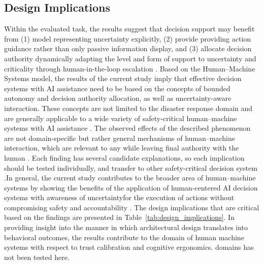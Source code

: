 \documentclass[journal]{IEEEtran}
\theoremstyle{plain}
\theoremstyle{definition}
\providecommand{\DIFaddtex}[1]{{\protect\color{blue} \sf #1}} %
\providecommand{\DIFdeltex}[1]{{\protect\color{red} \scriptsize #1}} %
\providecommand{\DIFaddbegin}{} %
\providecommand{\DIFaddend}{} %
\providecommand{\DIFdelbegin}{} %
\providecommand{\DIFdelend}{} %
\providecommand{\DIFadd}[1]{\texorpdfstring{\DIFaddtex{#1}}{#1}} %
\providecommand{\DIFdel}[1]{\texorpdfstring{\DIFdeltex{#1}}{}} %
\newcommand{\DIFscaledelfig}{0.5}
\newlength{\DIFdelgraphicswidth} %
\newlength{\DIFdelgraphicsheight} %
\newcommand{\DIFaddincludegraphics}[2][]{{\color{blue}\fbox{\DIFOincludegraphics[#1]{#2}}}} %
\newcommand{\DIFdelincludegraphics}[2][]{%
\sbox{\DIFdelgraphicsbox}{\DIFOincludegraphics[#1]{#2}}%
\settoboxwidth{\DIFdelgraphicswidth}{\DIFdelgraphicsbox} %
\settoboxtotalheight{\DIFdelgraphicsheight}{\DIFdelgraphicsbox} %
\scalebox{\DIFscaledelfig}{%
\parbox[b]{\DIFdelgraphicswidth}{\usebox{\DIFdelgraphicsbox}\\[-\baselineskip] \rule{\DIFdelgraphicswidth}{0em}}\llap{\resizebox{\DIFdelgraphicswidth}{\DIFdelgraphicsheight}{%
\setlength{\unitlength}{\DIFdelgraphicswidth}%
\begin{picture}(1,1)%
\thicklines\linethickness{2pt} %
{\color[rgb]{1,0,0}\put(0,0){\framebox(1,1){}}}%
{\color[rgb]{1,0,0}\put(0,0){\line( 1,1){1}}}%
{\color[rgb]{1,0,0}\put(0,1){\line(1,-1){1}}}%
\end{picture}%
}\hspace*{3pt}}} %
} %
\DeclareRobustCommand{\DIFaddbegin}{\DIFOaddbegin \let\includegraphics\DIFaddincludegraphics} %
\DeclareRobustCommand{\DIFaddend}{\DIFOaddend \let\includegraphics\DIFOincludegraphics} %
\DeclareRobustCommand{\DIFdelbegin}{\DIFOdelbegin \let\includegraphics\DIFdelincludegraphics} %
\DeclareRobustCommand{\DIFdelend}{\DIFOaddend \let\includegraphics\DIFOincludegraphics} %
\begin{document}
\subsection{\DIFadd{Design Implications}}
\DIFadd{Within the evaluated task, the results suggest that decision support may benefit from }\DIFaddend (1) \DIFdelbegin \DIFdel{model }\DIFdelend \DIFaddbegin \DIFadd{representing }\DIFaddend uncertainty explicitly, (2) \DIFdelbegin \DIFdel{provide }\DIFdelend \DIFaddbegin \DIFadd{providing }\DIFaddend action guidance rather than \DIFaddbegin \DIFadd{only }\DIFaddend passive information display, and (3) \DIFdelbegin \DIFdel{allocate decision authority dynamically }\DIFdelend \DIFaddbegin \DIFadd{adapting the level and form of support to uncertainty and criticality }\DIFaddend through human-in-the-loop escalation \DIFdelbegin \DIFdel{\cite{Assaad2023TAS,Zhang2022THMS,Bach2024Access}.
Based on the Human--Machine Systems model, the results of the current study imply that effective decision systems with AI assistance need to be based on the concepts of bounded autonomy and decision authority allocation, as well as uncertainty-aware interaction.
These concepts are not limited to the disaster response domain and are generally applicable to a wide variety of safety-critical human--machine systems with AI assistance \cite{Yang2022THMSReview,PerezCerrolaza2024CSUR}.
The observed effects of the described phenomenon are not domain-specific but rather general mechanisms of human--machine interaction, which are relevant to any }\DIFdelend \DIFaddbegin \DIFadd{while leaving final authority with the human \cite{Assaad2023TAS,Zhang2022THMS,Bach2024Access,Parasuraman2000LOA}. Each finding has several candidate explanations, so each implication should be tested individually, and transfer to other }\DIFaddend safety-critical \DIFdelbegin \DIFdel{decision system \cite{Bach2024Access,Hodgson2013THMS}.In general, the current study contributes to the broader area of human--machine systems by showing the benefits of the application of human-centered AI decision systems with awareness of uncertaintyfor the execution of actions without compromising safety and accountability \cite{Lai2023FAccT,Yang2022THMSReview}.
The design implications that are critical based on the findings are presented in Table~\ref{tab:design_implications}.
In providing insight into the manner in which architectural design translates into behavioral outcomes, the results contribute to the domain of human machine systems with respect to trust calibration and cognitive ergonomics. }\DIFdelend \DIFaddbegin \DIFadd{domains \cite{PerezCerrolaza2024CSUR} has not been tested here.
}\DIFaddend 
\end{document}
